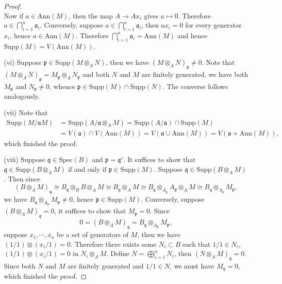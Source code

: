 \begin{proof}
$$$$
Now if $a\in\mathrm{Ann}(M)$, then the map $A\to Ax_i$ gives $a\mapsto 0$. Therefore $a\in\bigcap_{i=1}^n\mathfrak{a}_i$. Conversely, suppose $a\in\bigcap_{i=1}^n\mathfrak{a}_i$, then $ax_i=0$ for every generator $x_i$, hence $a\in\mathrm{Ann}(M)$. Therefore $\bigcap_{i=1}^n\mathfrak{a}_i=\mathrm{Ann}(M)$ and hence $\mathrm{Supp}(M)=V(\mathrm{Ann}(M))$.\par
(vi) Suppose $\mathfrak{p}\in\mathrm{Supp}(M\otimes_AN)$, then we have $(M\otimes_AN)_\mathfrak{p}\ne 0$. Note that 
$\left( M\otimes _AN \right) _{\mathfrak{p}}=M_{\mathfrak{p}}\otimes _AN_{\mathfrak{p}}$ and both $N$ and $M$ are finitely generated, we have both $M_\mathfrak{p}$ and $N_\mathfrak{p}\ne 0$, whence $\mathfrak{p}\in\mathrm{Supp}(M)\cap\mathrm{Supp}(N)$. The converse follows analogously.\par
(vii) Note that 
$$
\begin{aligned}
\mathrm{Supp}\left( M/\mathfrak{a} M \right) &=\mathrm{Supp}\left( A/\mathfrak{a} \otimes _AM \right) =\mathrm{Supp}\left( A/\mathfrak{a} \right) \cap \mathrm{Supp}\left( M \right) 
\\
&=V\left( \mathfrak{a} \right) \cap V\left( \mathrm{Ann}\left( M \right) \right) =V\left( \mathfrak{a} \cup \mathrm{Ann}\left( M \right) \right) =V\left( \mathfrak{a} +\mathrm{Ann}\left( M \right) \right) ,
\end{aligned}
$$
which finished the proof.\par
(viii) Suppose $\mathfrak{q}\in\mathrm{Spec}(B)$ and $\mathfrak{p}=\mathfrak{q}^c$. It suffices to show that $\mathfrak{q}\in\mathrm{Supp}(B\otimes_AM)$ if and only if $\mathfrak{p}\in\mathrm{Supp}(M)$. Suppose $\mathfrak{q}\in\mathrm{Supp}(B\otimes_AM)$. Then since 
$$
\left( B\otimes _AM \right) _{\mathfrak{q}}\cong B_{\mathfrak{q}}\otimes _BB\otimes _AM\cong B_{\mathfrak{q}}\otimes _AM\cong B_{\mathfrak{q}}\otimes _{A_{\mathfrak{p}}}A_{\mathfrak{p}}\otimes _AM\cong B_{\mathfrak{q}}\otimes _{A_{\mathfrak{p}}}M_{\mathfrak{p}},
$$
we have $B_{\mathfrak{q}}\otimes _{A_{\mathfrak{p}}}M_{\mathfrak{p}}\ne 0$, hence $\mathfrak{p}\in\mathrm{Supp}(M)$. Conversely, suppose $(B\otimes_AM)_\mathfrak{q}=0$, it suffices to show that $M_\mathfrak{p}=0$. Since 
$$
0=\left( B\otimes _AM \right) _{\mathfrak{q}}=B_{\mathfrak{q}}\otimes _{A_{\mathfrak{p}}}M_{\mathfrak{p}},
$$
suppose $x_1,\cdots,x_n$ be a set of generators of $M$, then we have $(1/1)\otimes(x_i/1)=0$. Therefore there exists some $N_i\subset B$ such that $1/1\in N_i$, $(1/1)\otimes(x_i/1)=0$ in $N_i\otimes_AM$. Define $N=\bigoplus_{i=1}^nN_i$, then $(N\otimes_AM)_\mathfrak{q}=0$. Since both $N$ and $M$ are finitely generated and $1/1\in N$, we must have $M_\mathfrak{q}=0$, which finished the proof. 
\end{proof}
